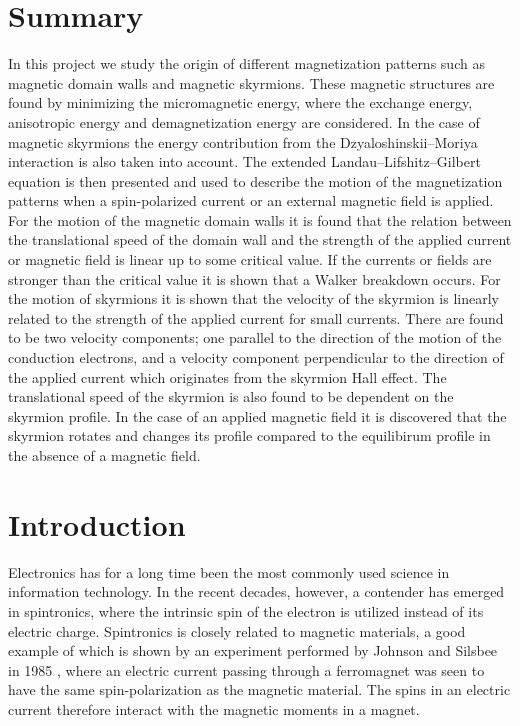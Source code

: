 \documentclass[12pt, a4paper]{article}		%
\numberwithin{equation}{section}
\begin{document}
\section*{Summary}
In this project we study the origin of different magnetization patterns such as magnetic domain walls and magnetic skyrmions. These magnetic structures are found by minimizing the micromagnetic energy, where the exchange energy, anisotropic energy and demagnetization energy are considered. In the case of magnetic skyrmions the energy contribution from the Dzyaloshinskii--Moriya interaction is also taken into account. The extended Landau--Lifshitz--Gilbert equation is then presented and used to describe the motion of the magnetization patterns when a spin-polarized current or an external magnetic field is applied. For the motion of the magnetic domain walls it is found that the relation between the translational speed of the domain wall and the strength of the applied current or magnetic field is linear up to some critical value. If the currents or fields are stronger than the critical value it is shown that a Walker breakdown occurs. For the motion of skyrmions it is shown that the velocity of the skyrmion is linearly related to the strength of the applied current for small currents. There are found to be two velocity components; one parallel to the direction of the motion of the conduction electrons, and a velocity component perpendicular to the direction of the applied current which originates from the skyrmion Hall effect. The translational speed of the skyrmion is also found to be dependent on the skyrmion profile. In the case of an applied magnetic field it is discovered that the skyrmion rotates and changes its profile compared to the equilibirum profile in the absence of a magnetic field.
\newpage

\tableofcontents

\newpage

\section{Introduction}
Electronics has for a long time been the most commonly used science in information technology. In the recent decades, however, a contender has emerged in spintronics, where the intrinsic spin of the electron is utilized instead of its electric charge. Spintronics is closely related to magnetic materials, a good example of which is shown by an experiment performed by Johnson and Silsbee in 1985 \cite{JohnsonSilsbee1985}, where an electric current passing through a ferromagnet was seen to have the same spin-polarization as the magnetic material. The spins in an electric current therefore interact with the magnetic moments in a magnet.
\end{document}
